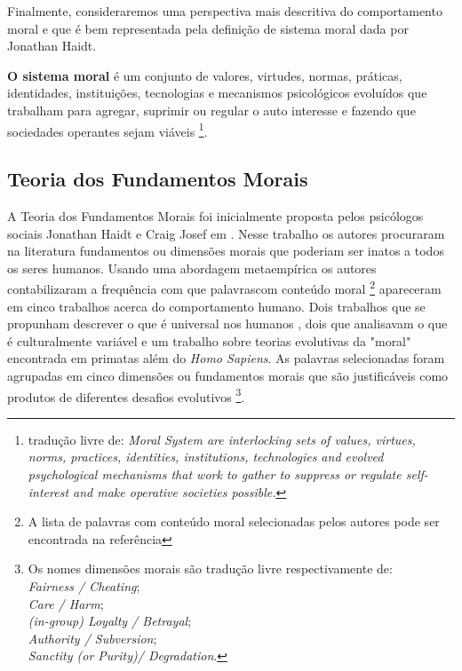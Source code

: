 Finalmente, consideraremos uma perspectiva mais descritiva do comportamento
moral e que é bem representada pela definição de sistema moral dada por
Jonathan Haidt.
\begin{description}
    \item
        \textbf{O sistema moral} é um conjunto de valores, virtudes, normas,
        práticas, identidades, instituições, tecnologias e mecanismos
        psicológicos evoluídos que trabalham para agregar, suprimir ou regular
        o auto interesse e fazendo que sociedades operantes sejam viáveis
        \footnote{ tradução livre de:\textit{ Moral System are interlocking
        sets of values, virtues, norms, practices, identities, institutions,
        technologies and evolved psychological mechanisms that work to gather
        to suppress or regulate self-interest and make operative societies
        possible.} }.
\end{description}


\subsection{Teoria dos Fundamentos Morais}%

A Teoria dos Fundamentos Morais foi inicialmente proposta pelos psicólogos
sociais Jonathan Haidt e Craig Josef em . Nesse trabalho os
autores procuraram na literatura fundamentos ou dimensões morais que poderiam
ser inatos a todos os seres humanos. Usando uma abordagem metaempírica os
autores contabilizaram a frequência com que palavrascom conteúdo moral
\footnote{A lista de palavras com conteúdo moral selecionadas pelos autores
pode ser encontrada na referência\citep{Graham2009}} apareceram em cinco
trabalhos acerca do comportamento humano. Dois trabalhos que se propunham
descrever o que é universal nos humanos \citep{Brown1991,Fiske1991}, dois que
analisavam o que é culturalmente variável\citep{Schwartz1990,Shweder1997a} e
um trabalho sobre teorias evolutivas da "moral" encontrada em primatas  além
do \textit{Homo Sapiens}\citep{Waal1997}.  As palavras selecionadas foram
agrupadas em cinco dimensões ou fundamentos morais que são justificáveis
como produtos de diferentes desafios evolutivos
\footnote{
    Os nomes dimensões morais são tradução livre respectivamente de:\\
    \textit{Fairness / Cheating};\\ \textit{Care / Harm};\\
    \textit{(in-group) Loyalty / Betrayal}; \\
    \textit{Authority / Subversion};\\ \textit{Sanctity (or Purity)/ Degradation}.}.

